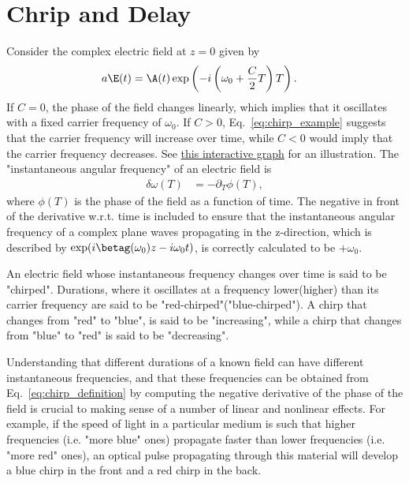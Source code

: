 \section{Chrip and Delay}
Consider the complex electric field at $z=0$ given by
\begin{align}
\label{eq:chirp_example}
    a\E(t) &= \A(t)\exp\left(  -i\left(\omega_0 +\frac{C}{2}T \right)T   \right).
\end{align}
If $C=0$, the phase of the field changes linearly, which implies that it oscillates with a fixed carrier frequency of $\omega_0$. If $C>0$, Eq.~\ref{eq:chirp_example} suggests that the carrier frequency will increase over time, while $C<0$ would imply that the carrier frequency decreases. See \href{https://www.desmos.com/calculator/gd7s8nhfdn}{this interactive graph} for an illustration. The "instantaneous angular frequency" of an electric field is
\begin{align}
\label{eq:chirp_definition}
    \delta\omega(T) &= -\partial_T\phi(T),
\end{align}
where $\phi(T)$ is the phase of the field as a function of time. The negative in front of the derivative w.r.t. time is included to ensure that the instantaneous angular frequency of a complex plane waves propagating in the z-direction, which is described by $\exp(i\betag(\omega_0)z-i\omega_0 t)$, is correctly calculated to be $+\omega_0$.

An electric field whose instantaneous frequency changes over time is said to be "chirped". Durations, where it oscillates at a frequency lower(higher) than its carrier frequency are said to be "red-chirped"("blue-chirped"). A chirp that changes from "red" to "blue", is said to be "increasing", while a chirp that changes from "blue" to "red" is said to be "decreasing". 

Understanding that different durations of a known field can have different instantaneous frequencies, and that these frequencies can be obtained from Eq.~\ref{eq:chirp_definition} by computing the negative derivative of the phase of the field is crucial to making sense of a number of linear and nonlinear effects. For example, if the speed of light in a particular medium is such that higher frequencies (i.e. "more blue" ones) propagate faster than lower frequencies (i.e. "more red" ones), an optical pulse propagating through this material will develop a blue chirp in the front and a red chirp in the back. 

